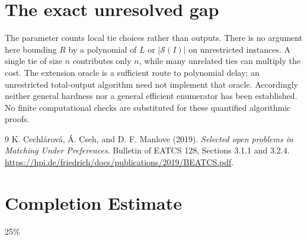 \documentclass[11pt]{article}
\theoremstyle{remark}
\begin{document}
\section{The exact unresolved gap}
The parameter counts local tie choices rather than outputs. There is
no argument here bounding $R$ by a polynomial of $L$ or
$|\mathcal S(I)|$ on unrestricted instances. A single tie of size $n$
contributes only $n$, while many unrelated ties can multiply the cost.
The extension oracle is a sufficient route to polynomial delay; an
unrestricted total-output algorithm need not implement that oracle.
Accordingly neither general hardness nor a general efficient enumerator
has been established. No finite computational checks are substituted
for these quantified algorithmic proofs.
\begin{thebibliography}{9}
 K. Cechl\'arov\'a, \'A. Cseh, and D. F. Manlove (2019).
\emph{Selected open problems in Matching Under Preferences}.
Bulletin of EATCS 128, Sections 3.1.1 and 3.2.4.
\url{https://hpi.de/friedrich/docs/publications/2019/BEATCS.pdf}.
\end{thebibliography}
\section{Completion Estimate}
25\%
\end{document}
